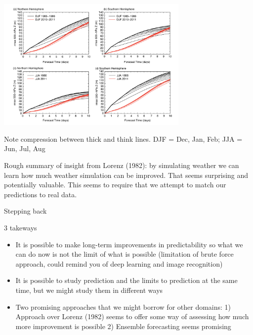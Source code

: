 \documentclass[aspectratio=169]{beamer}
\begin{document}
\begin{frame}

\begin{center}
\includegraphics[width = 0.7\textwidth]{figures/froude_atmospheric_2013_fig2}
\end{center}

\vfill
\small{Note compression between thick and think lines. DJF = Dec, Jan, Feb; JJA = Jun, Jul, Aug}
\end{frame}
\begin{frame}

Rough summary of insight from Lorenz (1982): by simulating weather we can learn how much weather simulation can be improved.   That seems surprising and potentially valuable.  This seems to require that we attempt to match our predictions to real data.

\end{frame}
\begin{frame}

Stepping back

\end{frame}
\begin{frame}

3 takeways
\begin{itemize}
\item It is possible to make long-term improvements in predictability so what we can do now is not the limit of what is possible (limitation of brute force approach, could remind you of deep learning and image recognition)
\pause
\item It is possible to study prediction and the limits to prediction at the same time, but we might study them in different ways
\pause
\item Two promising approaches that we might borrow for other domains: 1) Approach over Lorenz (1982) seems to offer some way of assessing how much more improvement is possible 2) Ensemble forecasting seems promising
\end{itemize}

\end{frame}
\frame{\titlepage}
\end{document}
